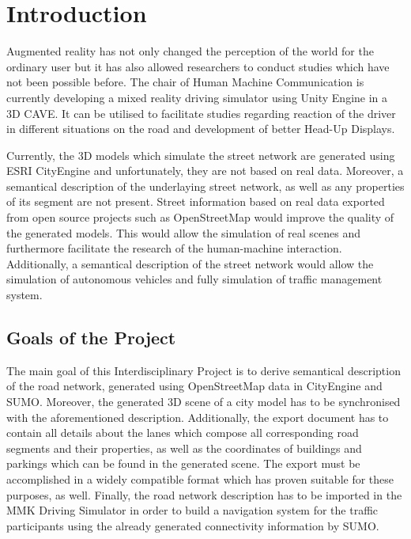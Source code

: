\chapter{Introduction}
\label{ch:introduction}
Augmented reality has not only changed the perception of the world for the ordinary user but it has also allowed researchers to conduct studies which have not been possible before. The chair of Human Machine Communication is currently developing a mixed reality driving simulator using Unity Engine in a 3D CAVE. It can be utilised to facilitate studies regarding reaction of the driver in different situations on the road and development of better Head-Up Displays.

Currently, the 3D models which simulate the street network are generated using ESRI CityEngine and unfortunately, they are not based on real data. Moreover, a semantical description of the underlaying street network, as well as any properties of its segment are not present. Street information based on real data exported from open source projects such as OpenStreetMap would improve the quality of the generated models. This would allow the simulation of real scenes and furthermore facilitate the research of the human-machine interaction. Additionally, a semantical description of the street network would allow the simulation of autonomous vehicles and fully simulation of traffic management system. 
 
\section{Goals of the Project}
\label{sec:goals}
The main goal of this Interdisciplinary Project is to derive semantical description of the road network, generated using OpenStreetMap data in CityEngine and SUMO. Moreover, the generated 3D scene of a city model has to be synchronised with the aforementioned description. Additionally, the export document has to contain all details about the lanes which compose all corresponding road segments and their properties, as well as the coordinates of buildings and parkings which can be found in the generated scene. The export must be accomplished in a widely compatible format which has proven suitable for these purposes, as well. Finally, the road network description has to be imported in the MMK Driving Simulator in order to build a navigation system for the traffic participants using the already generated connectivity information by SUMO.

